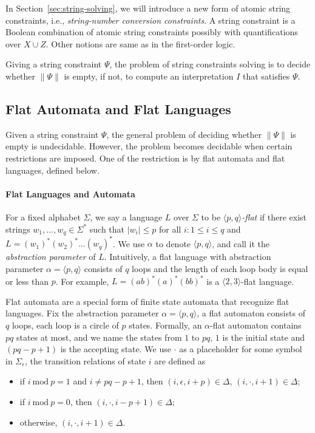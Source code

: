\documentclass[runningheads]{llncs}
\begin{document}
In Section~\ref{sec:string-solving},  
we will introduce a new form of atomic string constraints, i.e., \emph{string-number conversion constraints}.
A string constraint is a Boolean combination of atomic string constraints possibly with quantifications over $X\cup Z$. Other notions are same as in the first-order logic. 

Giving a string constraint $\Psi$,
the problem of string constraints solving is to decide 
whether $\lVert \Psi \rVert$ is empty,
if not, to compute an interpretation $I$ that satisfies $\Psi$.


\subsection{Flat Automata and Flat Languages}

Given a string constraint $\Psi$,
the general problem of deciding whether $\lVert \Psi \rVert$ is empty is undecidable.
However, 
the problem becomes decidable when certain restrictions are imposed.
One of the restriction is by flat automata and flat languages, 
defined below. 

\paragraph{Flat Languages and Automata}
For a fixed alphabet $\Sigma$,
we say a language $L$ over $\Sigma$ to be \emph{$\langle p,q \rangle$-flat} if 
there exist strings $w_1,...,w_q \in \Sigma^*$ such that
$|w_i|\le p$ for all $i:1\le i \le q$ 
and $L = (w_1)^*(w_2)^*...(w_q)^*$. 
We use $\alpha$ to denote $\langle p,q \rangle$, 
and call it the \emph{abstraction parameter} of $L$.
Intuitively,
a flat language with abstraction parameter $\alpha = \langle p,q \rangle$
consists of $q$ loops and the length of each loop body is equal or less than $p$.
For example,
$L = (ab)^*(a)^*(bb)^*$ is a $\langle 2,3 \rangle$-flat language.

Flat automata are a special form of finite state automata that 
recognize flat languages.
Fix the abstraction parameter $\alpha=\langle p,q\rangle$,
a flat automaton consists of $q$ loops,
each loop is a circle of $p$ states.
Formally, 
an $\alpha$-flat automaton contains $p q$ states at most,
and we name the states from $1$ to $p q$,
$1$ is the initial state and $(p q - p + 1)$ is the accepting state.
We use $\cdot$ as a placeholder for some symbol in $\Sigma_\epsilon$,
the transition relations of state $i$ are defined as 
\begin{itemize}
    \item if $i\  \text{mod}\  p = 1$ and $i \neq pq-p+1$, then 
    $(i,\epsilon,i+p)\in \Delta$,
    $(i, \cdot ,i+1) \in \Delta$;
    \item if $i\  \text{mod}\  p = 0$, then 
    $(i,\cdot , i-p+1) \in \Delta$;
    \item otherwise, $(i,\cdot, i+1) \in \Delta$.
\end{itemize}
\end{document}
